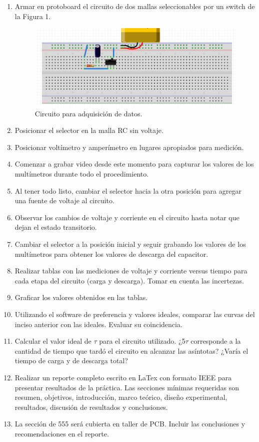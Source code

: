 \documentclass[letterpaper, 12 pt, conference]{ieeeconf}  %
\begin{document}
\begin{enumerate}
    \item Armar en protoboard el circuito de dos mallas seleccionables por un switch de la Figura 1.
\begin{figure}[h!]
    \centering
    \includegraphics[scale=0.5]{B1.png}
    \caption{Circuito para adquisición de datos.}
\end{figure}
    
    \item Posicionar el selector en la malla RC sin voltaje.
    \item Posicionar voltímetro y amperímetro en lugares apropiados para medición.
    \item Comenzar a grabar video desde este momento para capturar los valores de los multímetros durante todo el procedimiento.
    \item Al tener todo listo, cambiar el selector hacia la otra posición para agregar una fuente de voltaje al circuito.
    \item Observar los cambios de voltaje y corriente en el circuito hasta notar que dejan el estado transitorio.
    \item Cambiar el selector a la posición inicial y seguir grabando los valores de los multímetros para obtener los valores de descarga del capacitor.
    \item Realizar tablas  con las mediciones de voltaje y corriente versus tiempo para cada etapa del circuito (carga y descarga). Tomar en cuenta las incertezas.
    \item Graficar los valores obtenidos en las tablas.
    \item Utilizando el software de preferencia y valores ideales, comparar las curvas del inciso anterior con las ideales. Evaluar su coincidencia.
    \item Calcular el valor ideal de $\tau$ para el circuito utilizado. ¿5$\tau$ corresponde a la cantidad de tiempo que tardó el circuito en alcanzar las asíntotas? ¿Varía el tiempo de carga y de descarga total?
    \item Realizar un reporte completo escrito en LaTex con formato IEEE para presentar resultados de la práctica. Las secciones mínimas requeridas son resumen, objetivos, introducción, marco teórico, diseño experimental, resultados, discusión de resultados y conclusiones.
    
    \item La sección de 555 será cubierta en taller de PCB. Incluir las conclusiones y recomendaciones en el reporte.

\end{enumerate}
\end{document}
